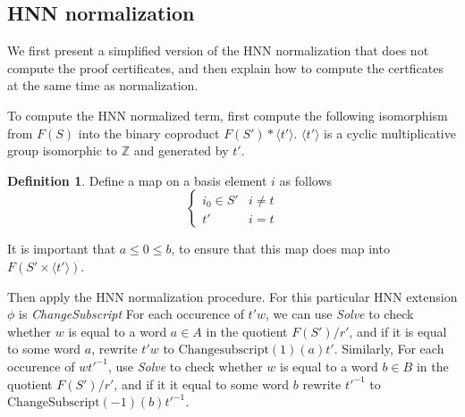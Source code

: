 \documentclass[11pt]{article} %
\theoremstyle{definition}
\theoremstyle{definition}
\theoremstyle{definition}
\theoremstyle{definition}
\theoremstyle{definition}
\newtheorem{defn}[theorem]{Definition}
\theoremstyle{definition}
\begin{document}



\subsection{HNN normalization}\label{HNNnorm}

We first present a simplified version of the HNN normalization that does not compute
the proof certificates, and then explain how to compute the certficates at the
same time as normalization.

To compute the HNN normalized term,
first compute the following isomorphism from $F(S)$ into the binary
coproduct $F(S') \ast \langle t' \rangle$. $\langle t' \rangle$ is a cyclic
multiplicative group isomorphic to $\mathbb{Z}$ and generated by $t'$.

\begin{defn}\label{tocoprod}
  Define a map on a basis element $i$ as follows
  \begin{equation}
    \begin{cases}
      i_0 \in S' & i \ne t \\
      t' & i = t
    \end{cases}
  \end{equation}
\end{defn}

It is important that $a \le 0 \le b$, to ensure that this map does map into
$F(S' \times \langle t' \rangle)$.

Then apply the HNN normalization procedure. For this particular HNN extension
$\phi$ is \textit{ChangeSubscript} %
For each occurence of $t'w$, we can use \textit{Solve} to check whether $w$ is equal
to a word  $a \in A$ in the quotient $F(S') / r'$, and if it is equal to some word $a$, rewrite
$t'w$ to $\text{Changesubscript}(1)(a)t'$. Similarly, For each occurence of
$wt'^{-1}$, use \textit{Solve}
to check whether $w$ is equal to a word $b \in B$ in the quotient
$F(S') / r'$, and if it it equal to
some word $b$ rewrite $t'^{-1}$ to $\text{ChangeSubscript}(-1)(b)t'^{-1}$.
\end{document}
